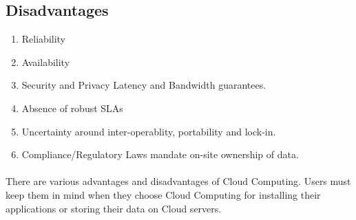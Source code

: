 \subsection{Disadvantages}
\begin{enumerate}
    \item Reliability
    \item Availability
    \item Security and Privacy Latency and Bandwidth guarantees.
    \item Absence of robust SLAs
    \item Uncertainty around inter-operablity, portability and lock-in.
    \item Compliance/Regulatory Laws mandate on-site ownership of data.
\end{enumerate}

\paragraph{\hspace{24pt}}
There are various advantages and disadvantages of Cloud Computing. Users must keep them in mind when they choose Cloud Computing for installing their applications or storing their data on Cloud servers.